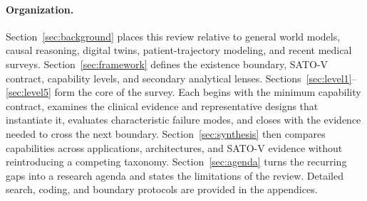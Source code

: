 \paragraph{Organization.} Section~\ref{sec:background} places this review relative to general world models, causal reasoning, digital twins, patient-trajectory modeling, and recent medical surveys. Section~\ref{sec:framework} defines the existence boundary, SATO-V contract, capability levels, and secondary analytical lenses. Sections~\ref{sec:level1}--\ref{sec:level5} form the core of the survey. Each begins with the minimum capability contract, examines the clinical evidence and representative designs that instantiate it, evaluates characteristic failure modes, and closes with the evidence needed to cross the next boundary. Section~\ref{sec:synthesis} then compares capabilities across applications, architectures, and SATO-V evidence without reintroducing a competing taxonomy. Section~\ref{sec:agenda} turns the recurring gaps into a research agenda and states the limitations of the review. Detailed search, coding, and boundary protocols are provided in the appendices.
